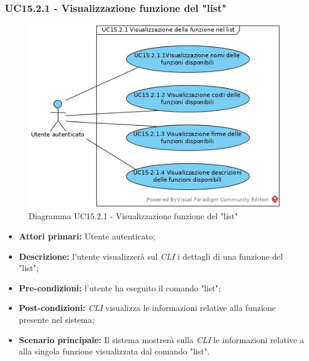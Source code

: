 \subsubsection{UC15.2.1 - Visualizzazione funzione del "list"}
\begin{figure}[h]
	\centering
	\includegraphics[width=0.7\linewidth]{res/img/UC15.2.1.jpg}
	\caption{Diagramma UC15.2.1 - Visualizzazione funzione del "list"}
\end{figure}
\begin{itemize}
	\item \textbf{Attori primari:} Utente autenticato;
	\item \textbf{Descrizione:} l'utente visualizzerà sul \textit{CLI\glo} i dettagli di una funzione del "list";
	\item \textbf{Pre-condizioni:} l'utente ha eseguito il comando "list";
	\item \textbf{Post-condizioni:} \textit{CLI\glo} visualizza le informazioni relative alla funzione presente nel sistema;
	\item \textbf{Scenario principale:} Il sistema mostrerà sulla \textit{CLI\glo} le informazioni relative a alla singola funzione visualizzata dal comando "list".
\end{itemize}

